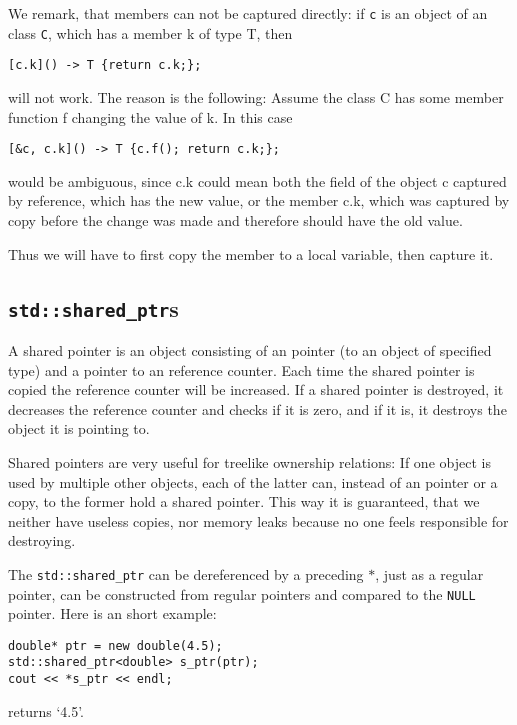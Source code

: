 \documentclass{article}
\newcommand{\NULL}{\texttt{NULL} pointer\xspace}
\begin{document}
We remark, that members can not be captured directly: if \texttt c is an object of an class \texttt C, which has a member k of type T, then
\begin{lstlisting}
[c.k]() -> T {return c.k;};
\end{lstlisting}
will not work. The reason is the following: Assume the class C has some member function f changing the value of k. In this case
\begin{lstlisting}
[&c, c.k]() -> T {c.f(); return c.k;};
\end{lstlisting}
would be ambiguous, since c.k could mean both the field of the object c captured by reference, which has the new value, or the member c.k, which was captured by copy before the change was made and therefore should have the old value.

Thus we will have to first copy the member to a local variable, then capture it.

\subsection{\texttt{std::shared\_ptr}s}

A shared pointer is an object consisting of an pointer (to an object of specified type) and a pointer to an reference counter. Each time the shared pointer is copied the reference counter will be increased. If a shared pointer is destroyed, it decreases the reference counter and checks if it is zero, and if it is, it destroys the object it is pointing to.

Shared pointers are very useful for treelike ownership relations: If one object is used by multiple other objects, each of the latter can, instead of an pointer or a copy, to the former hold a shared pointer. This way it is guaranteed, that we neither have useless copies, nor memory leaks because no one feels responsible for destroying.

The \texttt{std::shared\_ptr} can be dereferenced by a preceding $*$, just as a regular pointer, can be constructed from regular pointers and compared to the \NULL. Here is an short example:

\begin{lstlisting}
double* ptr = new double(4.5);
std::shared_ptr<double> s_ptr(ptr);
cout << *s_ptr << endl;
\end{lstlisting}
returns \lq 4.5\rq.
\end{document}
